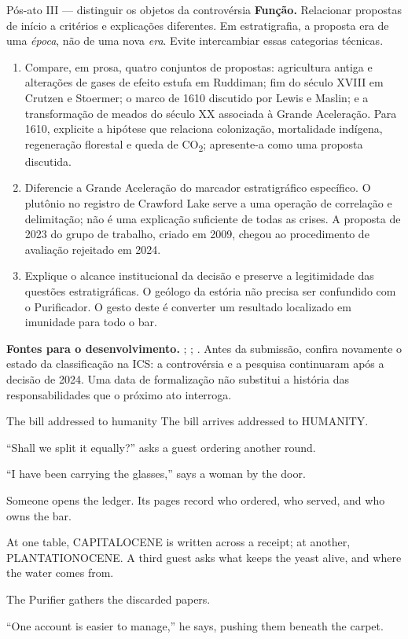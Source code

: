 \begin{orientacao}{Pós-ato III --- distinguir os objetos da controvérsia}
\textbf{Função.} Relacionar propostas de início a critérios e explicações
diferentes. Em estratigrafia, a proposta era de uma \textit{época}, não de
uma nova \textit{era}. Evite intercambiar essas categorias técnicas.
\begin{enumerate}
\item Compare, em prosa, quatro conjuntos de propostas: agricultura
antiga e alterações de gases de efeito estufa em Ruddiman; fim do
século XVIII em Crutzen e Stoermer; o marco de 1610 discutido por
Lewis e Maslin; e a transformação de meados do século XX associada
à Grande Aceleração. Para 1610, explicite a hipótese que relaciona
colonização, mortalidade indígena, regeneração florestal e queda de
CO\textsubscript{2}; apresente-a como uma proposta discutida.
\item Diferencie a Grande Aceleração do marcador estratigráfico
específico. O plutônio no registro de Crawford Lake serve a uma operação
de correlação e delimitação; não é uma explicação suficiente de todas
as crises. A proposta de 2023 do grupo de trabalho, criado em 2009,
chegou ao procedimento de avaliação rejeitado em 2024.
\item Explique o alcance institucional da decisão e preserve a
legitimidade das questões estratigráficas. O geólogo da estória não
precisa ser confundido com o Purificador. O gesto deste é converter
um resultado localizado em imunidade para todo o bar.
\end{enumerate}
\textbf{Fontes para o desenvolvimento.}
; ;
. Antes da submissão, confira novamente o estado
da classificação na ICS: a controvérsia e a pesquisa continuaram após
a decisão de 2024. Uma data de formalização não substitui a história
das responsabilidades que o próximo ato interroga.
\end{orientacao}

\begin{ato}{The bill addressed to humanity}
The bill arrives addressed to HUMANITY.

“Shall we split it equally?” asks a guest ordering another round.

“I have been carrying the glasses,” says a woman by the door.

Someone opens the ledger. Its pages record who ordered, who served, and
who owns the bar.

At one table, CAPITALOCENE is written across a receipt; at another,
PLANTATIONOCENE. A third guest asks what keeps the yeast alive, and where
the water comes from.

The Purifier gathers the discarded papers.

“One account is easier to manage,” he says, pushing them beneath the carpet.
\end{ato}

